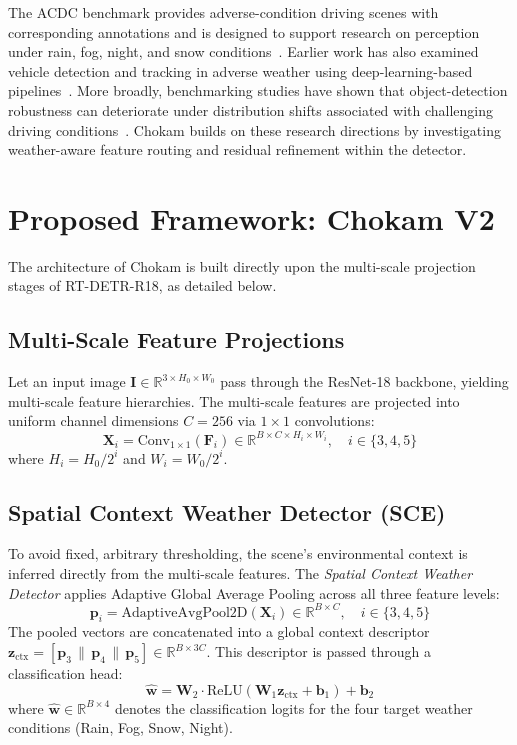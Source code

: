 \documentclass[conference]{IEEEtran}
\begin{document}
The ACDC benchmark provides adverse-condition driving scenes with corresponding annotations and is designed to support research on perception under rain, fog, night, and snow conditions~\cite{sakaridis2021acdc}. Earlier work has also examined vehicle detection and tracking in adverse weather using deep-learning-based pipelines~\cite{hassaballah2020vehicle}. More broadly, benchmarking studies have shown that object-detection robustness can deteriorate under distribution shifts associated with challenging driving conditions~\cite{michaelis2019benchmarking}. Chokam builds on these research directions by investigating weather-aware feature routing and residual refinement within the detector.

\section{Proposed Framework: Chokam V2}
The architecture of Chokam is built directly upon the multi-scale projection stages of RT-DETR-R18, as detailed below.

\subsection{Multi-Scale Feature Projections}
Let an input image $\mathbf{I} \in \mathbb{R}^{3 \times H_0 \times W_0}$ pass through the ResNet-18 backbone, yielding multi-scale feature hierarchies. The multi-scale features are projected into uniform channel dimensions $C=256$ via $1\times 1$ convolutions:
\begin{equation}
\mathbf{X}_i = \text{Conv}_{1\times 1}(\mathbf{F}_i) \in \mathbb{R}^{B \times C \times H_i \times W_i}, \quad i \in \{3, 4, 5\}
\end{equation}
where $H_i = H_0 / 2^i$ and $W_i = W_0 / 2^i$.

\subsection{Spatial Context Weather Detector (SCE)}
To avoid fixed, arbitrary thresholding, the scene's environmental context is inferred directly from the multi-scale features. The \textit{Spatial Context Weather Detector} applies Adaptive Global Average Pooling across all three feature levels:
\begin{equation}
\mathbf{p}_i = \text{AdaptiveAvgPool2D}(\mathbf{X}_i) \in \mathbb{R}^{B \times C}, \quad i \in \{3, 4, 5\}
\end{equation}
The pooled vectors are concatenated into a global context descriptor $\mathbf{z}_{\text{ctx}} = [\mathbf{p}_3 \,\|\, \mathbf{p}_4 \,\|\, \mathbf{p}_5] \in \mathbb{R}^{B \times 3C}$. This descriptor is passed through a classification head:
\begin{equation}
\hat{\mathbf{w}} = \mathbf{W}_2 \cdot \text{ReLU}(\mathbf{W}_1 \mathbf{z}_{\text{ctx}} + \mathbf{b}_1) + \mathbf{b}_2
\end{equation}
where $\hat{\mathbf{w}} \in \mathbb{R}^{B \times 4}$ denotes the classification logits for the four target weather conditions (Rain, Fog, Snow, Night).
\end{document}
